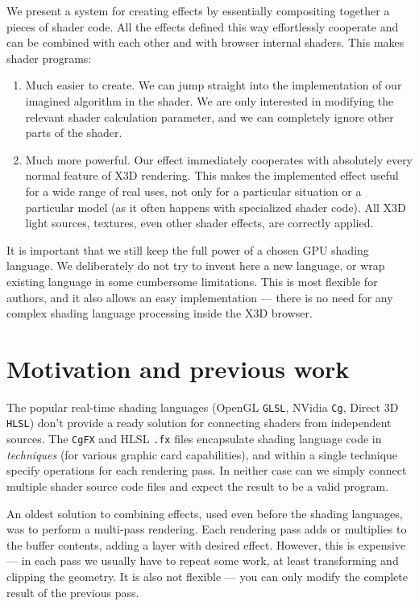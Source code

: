 \documentclass{acmsiggraph}                     %
\begin{document}
We present a system for creating effects by essentially compositing together
a pieces of shader code. All the effects defined this way effortlessly
cooperate and can be combined with each other and with browser internal
shaders. This makes shader programs:

\begin{enumerate}
\item Much easier to create. We can jump straight into the implementation
  of our imagined algorithm in the shader.
  We are only interested in modifying the relevant shader calculation
  parameter, and we can completely ignore other parts of the shader.

\item Much more powerful. Our effect
  immediately cooperates with absolutely every normal feature of X3D rendering.
  This makes the implemented effect useful for a wide range of real uses,
  not only for a particular situation or a particular model (as it often happens
  with specialized shader code).
  All X3D light sources, textures, even other shader effects,
  are correctly applied.
\end{enumerate}

It is important that we still keep
the full power of a chosen GPU shading language.
We deliberately do not try to invent here a new language, or wrap existing
language in some cumbersome limitations. This is most flexible for authors,
and it also allows an easy implementation --- there is no need for any complex
shading language processing inside the X3D browser.

\section{Motivation and previous work}

The popular real-time shading languages (OpenGL \texttt{GLSL}, NVidia \texttt{Cg}, Direct 3D \texttt{HLSL})
don't provide a ready solution for connecting shaders from independent sources.
The \texttt{CgFX} and HLSL \texttt{.fx} files encapsulate shading language code
in \emph{techniques} (for various graphic card capabilities),
and within a single technique specify operations for each rendering pass.
In neither case can we simply connect multiple shader source code files
and expect the result to be a valid program.

An oldest solution to combining effects, used even before the shading languages,
was to perform a multi-pass rendering. Each rendering pass adds or multiplies
to the buffer contents, adding a layer with desired effect.
However, this is expensive --- in each pass we usually have to repeat
some work, at least transforming and clipping the geometry.
It is also not flexible --- you can only modify
the complete result of the previous pass.
\end{document}

